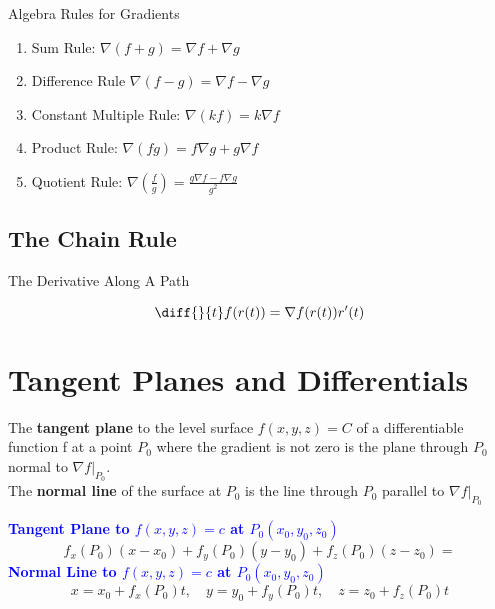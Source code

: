 \documentclass[12pt,a4paper,draft]{article}
\newenvironment{definition}{\begin{definitionbox}}{\end{definitionbox}\vspace{1\baselineskip}}
\newenvironment{ruleBox}[1]{\begin{rulebox}{#1}}{\end{rulebox}\vspace{1\baselineskip}}
\newenvironment{mynote}{\vspace{1\baselineskip}\begin{note}}{\end{note}\vspace{1\baselineskip}}
\begin{document}
\begin{ruleBox}{Algebra Rules for Gradients}

    \begin{enumerate}
        \item Sum Rule: \quad \(\nabla (f + g) = \nabla f + \nabla g\)
        \item Difference Rule \quad \(\nabla (f - g) = \nabla f - \nabla g\)
        \item Constant Multiple Rule: \quad \(\nabla (kf) = k \nabla f\)
        \item Product Rule: \quad \(\nabla(fg) = f \nabla g  + g \nabla f\)
        \item  Quotient Rule: \quad \(\nabla \left( \frac{f}{g}\right) = \frac{g \nabla f - f \nabla g}{g^2}\)
    \end{enumerate}

    
\end{ruleBox}


\subsection{The Chain Rule }

\begin{ruleBox}{The Derivative Along A Path}

    \[\diff{}{t}f(r(t))= \nabla f(r(t)) r'(t)\]
    
\end{ruleBox}


\section{Tangent Planes and Differentials}

\begin{definition}
    The \textbf{tangent plane} to the level surface \(f(x,y,z)=C\) of a differentiable function f at a point \(P_0\) where the gradient is not zero is the plane through \(P_0\) normal to \(\nabla f |_{P_0}\). \\
    The \textbf{normal line} of the surface at \(P_0\) is the line through \(P_0\) parallel to \(\nabla f |_{P_0}\)

\end{definition}


\begin{mynote}
    \textcolor{blue}{\textbf{Tangent Plane to \(f(x,y,z) = c\) at \(P_0(x_0,y_0,z_0)\)}}
    \[f_x(P_0)(x-x_0) + f_y(P_0)(y-y_0) + f_z(P_0)(z-z_0)=\]
    \textcolor{blue}{\textbf{Normal Line to \(f(x,y,z) = c\) at \(P_0(x_0,y_0,z_0)\)}}
    \[x = x_0 + f_x(P_0)t, \quad y = y_0 + f_y(P_0)t, \quad z = z_0 + f_z(P_0)t \]

\end{mynote}
\end{document}
